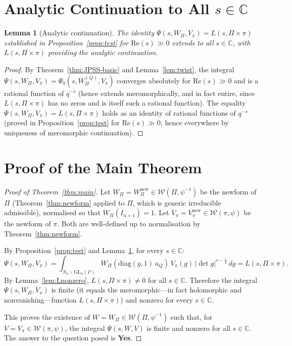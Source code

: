 \documentclass[12pt]{article}
\newtheorem{lemma}[theorem]{Lemma}
\begin{document}
\section{Analytic Continuation to All \texorpdfstring{$s \in \mathbb{C}$}{s in C}}

\begin{lemma}[Analytic continuation]\label{lem:analytic}
The identity $\Psi(s,W_\Pi,V_\pi) = L(s,\Pi\times\pi)$ established in
Proposition~\ref{prop:test} for $\mathrm{Re}(s) \gg 0$ extends to all
$s \in \mathbb{C}$, with $L(s,\Pi\times\pi)$ providing the analytic
continuation.
\end{lemma}

\begin{proof}
By Theorem~\ref{thm:JPSS-basic} and Lemma~\ref{lem:twist}, the integral
$\Psi(s,W_\Pi,V_\pi) = \Psi_0(s,W_\Pi^{(Q)},V_\pi)$ converges absolutely for
$\mathrm{Re}(s) \gg 0$ and is a rational function of $q^{-s}$ (hence extends
meromorphically, and in fact entire, since $L(s,\Pi\times\pi)$ has no zeros and
is itself such a rational function).  The equality $\Psi(s,W_\Pi,V_\pi) =
L(s,\Pi\times\pi)$ holds as an identity of rational functions of $q^{-s}$
(proved in Proposition~\ref{prop:test} for $\mathrm{Re}(s) \gg 0$, hence
everywhere by uniqueness of meromorphic continuation).
\end{proof}

\section{Proof of the Main Theorem}

\begin{proof}[Proof of Theorem~\ref{thm:main}]
Let $W_\Pi = W_\Pi^{\mathrm{new}} \in \mathcal{W}(\Pi,\psi^{-1})$ be the
newform of $\Pi$ (Theorem~\ref{thm:newform} applied to $\Pi$, which is generic
irreducible admissible), normalised so that $W_\Pi(I_{n+1}) = 1$.  Let
$V_\pi = V_\pi^{\mathrm{new}} \in \mathcal{W}(\pi,\psi)$ be the newform of
$\pi$.  Both are well-defined up to normalisation by Theorem~\ref{thm:newform}.

By Proposition~\ref{prop:test} and Lemma~\ref{lem:analytic}, for every $s \in
\mathbb{C}$:
\begin{equation}\label{eq:final-identity}
  \Psi(s, W_\Pi, V_\pi)
  = \int_{N_n\backslash\mathrm{GL}_n(F)}
    W_\Pi\!\left(\mathrm{diag}(g,1)\,u_Q\right)\, V_\pi(g)\,
    |\det g|^{s-\frac{1}{2}}\, dg
  = L(s,\Pi\times\pi).
\end{equation}
By Lemma~\ref{lem:Lnonzero}, $L(s,\Pi\times\pi) \neq 0$ for all $s \in \mathbb{C}$.
Therefore the integral $\Psi(s,W_\Pi,V_\pi)$ is finite (it equals the
meromorphic—in fact holomorphic and nonvanishing—function $L(s,\Pi\times\pi)$)
and nonzero for every $s \in \mathbb{C}$.

This proves the existence of $W = W_\Pi \in \mathcal{W}(\Pi,\psi^{-1})$ such
that, for $V = V_\pi \in \mathcal{W}(\pi,\psi)$, the integral
$\Psi(s,W,V)$ is finite and nonzero for all $s \in \mathbb{C}$.  The answer
to the question posed is \textbf{Yes}.
\end{proof}
\end{document}
